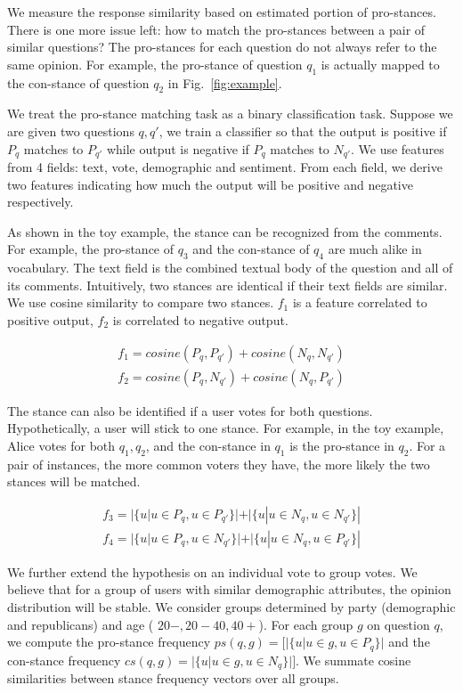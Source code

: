\documentclass{llncs}
\begin{document}
We measure the response similarity based on estimated portion of pro-stances. There is one more issue left: how to match the pro-stances between a pair of similar questions?  The pro-stances for each question do not always refer to the same opinion. For example, the pro-stance of question $q_1$ is actually mapped to the con-stance of question $q_2$ in Fig.~\ref{fig:example}. 

We treat the pro-stance matching task as a binary classification task. Suppose we are given two questions $q,q'$, we train a classifier so that the output is positive if $P_q$ matches to $P_{q'}$ while output is negative if $P_q$ matches to $N_{q'}$.  We use features from 4 fields: text, vote, demographic and sentiment. From each field, we derive two features indicating how much the output will be positive and negative respectively. 

As shown in the toy example, the stance can be recognized from the comments. For example, the pro-stance of $q_3$ and the con-stance of $q_4$ are much alike in vocabulary. The text field is the combined textual body of the question and all of its comments. Intuitively, two stances are identical if their text fields are similar. We use cosine similarity to compare two stances. $f_1$ is a feature correlated to positive output, $f_2$ is correlated to negative output.

\begin{eqnarray}
f_1= cosine (P_q,P_{q'})+cosine (N_q,N_{q'}) \\
f_2= cosine (P_q,N_{q'})+cosine (N_q,P_{q'})
\end{eqnarray}


The stance can also be identified if a user votes for both questions. Hypothetically, a user will stick to one stance. For example, in the toy example, Alice votes for both $q_1,q_2$, and the con-stance in $q_1$ is the pro-stance in $q_2$. For a pair of instances, the more common voters they have, the more likely the two stances will be matched.

\begin{eqnarray}
f_3=|\{u|u\in P_q,u\in P_{q'}\}|+|\{u|u\in N_q,u\in N_{q'}\}| \\
f_4=|\{u|u\in P_q,u\in N_{q'}\}|+|\{u|u\in N_q,u\in P_{q'}\}|
\end{eqnarray}


We further extend the hypothesis on an individual vote to group votes. We believe that for a group of users with similar demographic attributes, the opinion distribution will be stable. We consider groups determined by party (demographic and republicans) and age ( $20-,20-40,40+$). For each group $g$ on question $q$, we compute the pro-stance frequency $ps(q,g)=[|\{u|u\in g, u \in P_q\}|$ and the con-stance frequency $cs(q,g) =|\{u|u\in g, u \in N_q\}|]$. We summate cosine similarities between stance frequency vectors over all groups. 
\end{document}
